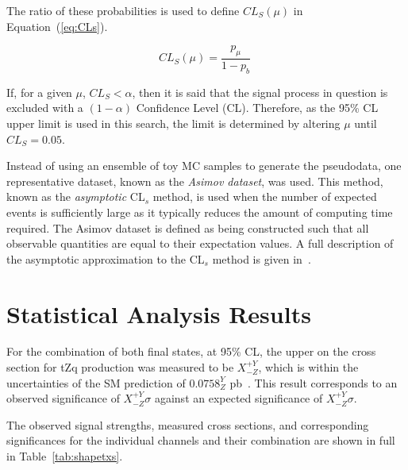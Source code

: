 The ratio of these probabilities is used to define $CL_{S} (\mu)$ in Equation~(\ref{eq:CLs}).

\begin{equation}
CL_{S} (\mu) = \frac{ p_{\mu} }{ 1 - p_{b} }\;
\label{eq:CLs}
\end{equation}

If, for a given $\mu$, $CL_{S} < \alpha$, then it is said that the signal process in question is excluded with a $(1 - \alpha)$ Confidence Level (CL).
Therefore, as the 95\% CL upper limit is used in this search, the limit is determined by altering $\mu$  until $CL_{S} = 0.05$.

Instead of using an ensemble of toy MC samples to generate the pseudodata, one representative dataset, known as the \emph{Asimov dataset}, was used.
This method, known as the \emph{asymptotic} CL$_{s}$ method, is used when the number of expected events is sufficiently large as it typically reduces the amount of computing time required.
The Asimov dataset is defined as being constructed such that all observable quantities are equal to their expectation values.
A full description of the asymptotic approximation to the CL$_{s}$ method is given in~\cite{AsymptoticFormulae}.

\section{Statistical Analysis Results}
For the combination of both final states, at 95\% CL, the upper on the cross section for tZq production was measured to be $X^{+Y}_{-Z}$, which is within the uncertainties of the SM prediction of $0.0758^{Y}_{Z}$ pb~\cite{}.
This result corresponds to an observed significance of $X_{-Z}^{+Y} \sigma$ against an expected significance of $X_{-Z}^{+Y} \sigma$.

The observed signal strengths, measured cross sections, and corresponding significances for the individual channels and their combination are shown in full in Table~\ref{tab:shapetxs}.

